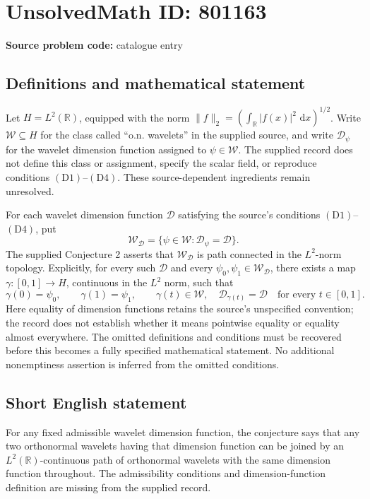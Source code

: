 \documentclass[11pt]{article}
\newcommand{\R}{\mathbb{R}}
\newcommand{\dd}{\,\mathrm{d}}
\begin{document}
\section*{UnsolvedMath ID: 801163}
\textbf{Source problem code:} catalogue entry
\subsection{Definitions and mathematical statement}
Let \(H=L^2(\R)\), equipped with the norm \(\|f\|_2=(\int_{\R}|f(x)|^2\,\dd x)^{1/2}\). Write \(\mathcal W\subseteq H\) for the class called ``o.n. wavelets'' in the supplied source, and write \(\mathscr D_\psi\) for the wavelet dimension function assigned to \(\psi\in\mathcal W\). The supplied record does not define this class or assignment, specify the scalar field, or reproduce conditions \((\mathrm{D1})\)--\((\mathrm{D4})\). These source-dependent ingredients remain unresolved.

For each wavelet dimension function \(\mathscr D\) satisfying the source's conditions \((\mathrm{D1})\)--\((\mathrm{D4})\), put
\[
\mathcal W_{\mathscr D}=\{\psi\in\mathcal W:\mathscr D_\psi=\mathscr D\}.
\]
The supplied Conjecture 2 asserts that \(\mathcal W_{\mathscr D}\) is path connected in the \(L^2\)-norm topology. Explicitly, for every such \(\mathscr D\) and every \(\psi_0,\psi_1\in\mathcal W_{\mathscr D}\), there exists a map \(\gamma:[0,1]\to H\), continuous in the \(L^2\) norm, such that
\[
\gamma(0)=\psi_0,\qquad \gamma(1)=\psi_1,\qquad
\gamma(t)\in\mathcal W,\quad \mathscr D_{\gamma(t)}=\mathscr D
\quad\text{for every }t\in[0,1].
\]
Here equality of dimension functions retains the source's unspecified convention; the record does not establish whether it means pointwise equality or equality almost everywhere. The omitted definitions and conditions must be recovered before this becomes a fully specified mathematical statement. No additional nonemptiness assertion is inferred from the omitted conditions.
\subsection{Short English statement}
For any fixed admissible wavelet dimension function, the conjecture says that any two orthonormal wavelets having that dimension function can be joined by an \(L^2(\R)\)-continuous path of orthonormal wavelets with the same dimension function throughout. The admissibility conditions and dimension-function definition are missing from the supplied record.
\end{document}
